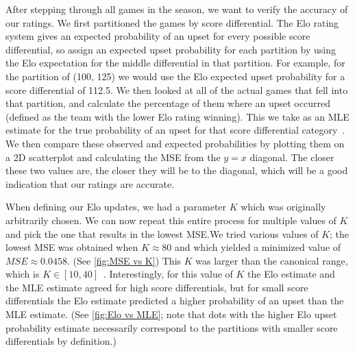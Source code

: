 \documentclass{article}
\begin{document}
After stepping through all games in the season, we want to verify the accuracy of our ratings. We first partitioned the games by score differential. The Elo rating system gives an expected probability of an upset for every possible score differential, so assign an expected upset probability for each partition by using the Elo expectation for the middle differential in that partition. For example, for the partition of (100, 125) we would use the Elo expected upset probability for a score differential of 112.5. We then looked at all of the actual games that fell into that partition, and calculate the percentage of them where an upset occurred (defined as the team with the lower Elo rating winning). This we take as an MLE estimate for the true probability of an upset for that score differential category~\cite{statproofbookMaximumLikelihood}. We then compare these observed and expected probabilities by plotting them on a 2D scatterplot and calculating the MSE from the $y=x$ diagonal. The closer these two values are, the closer they will be to the diagonal, which will be a good indication that our ratings are accurate. 

When defining our Elo updates, we had a parameter $K$ which was originally arbitrarily chosen. We can now repeat this entire process for multiple values of $K$ and pick the one that results in the lowest MSE.\@ We tried various values of $K$; the lowest MSE was obtained when $K\approx80$ and which yielded a minimized value of $MSE\approx0.0458$. (See \autoref{fig:MSE vs K}) This $K$ was larger than the canonical range, which is $K \in[10, 40]$~\cite{mediumRatingSystem}. Interestingly, for this value of $K$ the Elo estimate and the MLE estimate agreed for high score differentials, but for small score differentials the Elo estimate predicted a higher probability of an upset than the MLE estimate. (See \autoref{fig:Elo vs MLE}; note that dots with the higher Elo upset probability estimate necessarily correspond to the partitions with smaller score differentials by definition.)
\end{document}
